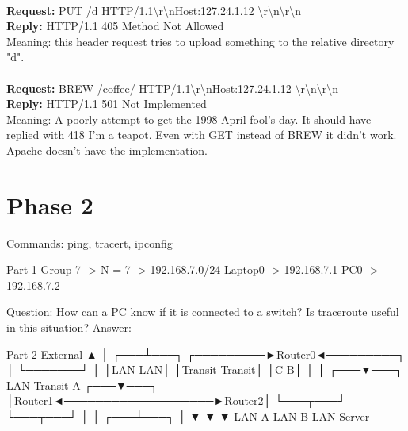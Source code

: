 \documentclass[11pt,a4paper]{report}
\begin{document}
        \\
        \textbf{Request:} PUT /d HTTP/1.1\textbackslash r\textbackslash nHost:127.24.1.12 \textbackslash r\textbackslash n\textbackslash r\textbackslash n \\
        \textbf{Reply:} HTTP/1.1 405 Method Not Allowed \\
        Meaning: this header request tries to upload something to the relative directory "d". \\
        \\
        \textbf{Request:} BREW /coffee/ HTTP/1.1\textbackslash r\textbackslash nHost:127.24.1.12 \textbackslash r\textbackslash n\textbackslash r\textbackslash n \\
        \textbf{Reply:} HTTP/1.1 501 Not Implemented \\
        Meaning: A poorly attempt to get the 1998 April fool's day. It should have replied with 418 I'm a teapot. Even with GET instead of BREW it didn't work. Apache doesn't have the implementation. \\

\chapter{Phase 2}
Commands: ping, tracert, ipconfig

Part 1
Group 7 -> N = 7 -> 192.168.7.0/24
Laptop0 -> 192.168.7.1
PC0     -> 192.168.7.2

Question: How can a PC know if it is connected to a switch? Is traceroute useful in this situation?
Answer: 


Part 2
                 External                 
                     ▲                    
                     │                    
                 ┌───┴───┐                
       ┌─────────►Router0◄─────────┐      
       │         └───────┘         │      
       │LAN                     LAN│      
       │Transit             Transit│      
       │C                         B│      
       │                           │      
   ┌───▼───┐   LAN Transit A   ┌───▼───┐  
   │Router1◄───────────────────►Router2│  
   └───┬───┘                   └───┬───┘  
       │                           │      
   ┌───┴───┐                       │      
   ▼       ▼                       ▼      
 LAN A   LAN B                 LAN Server 
\end{document}
